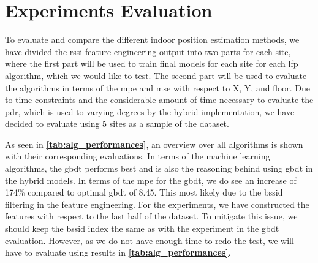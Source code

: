 \section{Experiments Evaluation}
To evaluate and compare the different indoor position estimation methods, we have divided the \gls{rssi}-feature engineering output into two parts for each site, where the first part will be used to train final models for each site for each \gls{lfp} algorithm, which we would like to test. The second part will be used to evaluate the algorithms in terms of the \gls{mpe} and \gls{mse} with respect to X, Y, and floor. Due to time constraints and the considerable amount of time necessary to evaluate the \gls{pdr}, which is used to varying degrees by the hybrid implementation, we have decided to evaluate using 5 sites as a sample of the dataset.


As seen in \textbf{\autoref{tab:alg_performances}}, an overview over all algorithms is shown with their corresponding evaluations. In terms of the machine learning algorithms, the \gls{gbdt} performs best and is also the reasoning behind using \gls{gbdt} in the hybrid models. In terms of the \gls{mpe} for the \gls{gbdt}, we do see an increase of 174\% compared to optimal \gls{gbdt} of 8.45. This most likely due to the \gls{bssid} filtering in the feature engineering. For the experiments, we have constructed the features with respect to the last half of the dataset. To mitigate this issue, we should keep the \gls{bssid} index the same as with the experiment in the \gls{gbdt} evaluation. However, as we do not have enough time to redo the test, we will have to evaluate using results in \textbf{\autoref{tab:alg_performances}}. 

